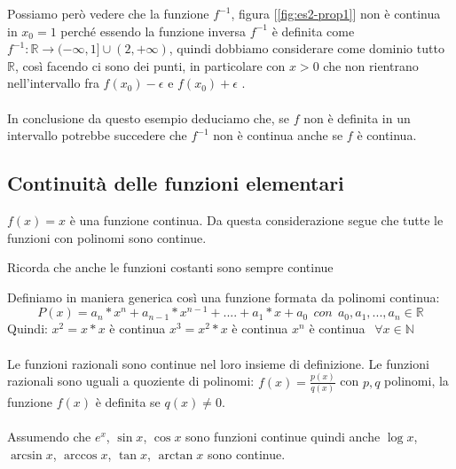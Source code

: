 Possiamo però vedere che la funzione $f^{-1}$, figura [\ref{fig:es2-prop1}] non è continua in $x_0 = 1$ perché essendo la funzione inversa $f^{-1}$ è definita come $f^{-1}: \mathbb{R} \longrightarrow (-\infty, 1] \cup (2, +\infty)$, quindi dobbiamo considerare come dominio tutto $\mathbb{R}$, così facendo ci sono dei punti, in particolare con $x > 0$ che non rientrano nell'intervallo fra $f(x_0) - \epsilon$ e $f(x_0) + \epsilon$ . \\ \\
In conclusione da questo esempio deduciamo che, se $f$ non è definita in un intervallo potrebbe succedere che $f^{-1}$ non è continua anche se $f$ è continua.

\subsection{Continuità delle funzioni elementari}
$f(x) = x$ è una funzione continua. Da questa considerazione segue che tutte le funzioni con polinomi sono continue.
\begin{note}
    Ricorda che anche le funzioni costanti sono sempre continue
\end{note}
Definiamo in maniera generica così una funzione formata da polinomi continua:
\begin{equation}
    P(x) = a_n * x^n + a_{n-1} * x^{n-1} + .... + a_1 * x + a_0 \: \: con \: \: a_0, a_1, ..., a_n \in \mathbb{R}
\end{equation}
Quindi: $x^2 = x * x$ è continua \hspace{.5cm} $x^3 = x^2 * x$ è continua \hspace{.5cm} $x^n$ è continua $\: \: \forall x \in \mathbb{N}$ \\ \\
Le funzioni razionali sono continue nel loro insieme di definizione. Le funzioni razionali sono uguali a quoziente di polinomi:
$f(x) = \frac{p(x)}{q(x)}$ con $p,q$ polinomi, la funzione $f(x)$ è definita se $q(x) \neq 0$.\\ \\
Assumendo che $e^x$, $\sin{x}$, $\cos{x}$ sono funzioni continue quindi anche $\log{x}$, $\arcsin{x}$, $\arccos{x}$, $\tan{x}$, $\arctan{x}$ sono continue.

